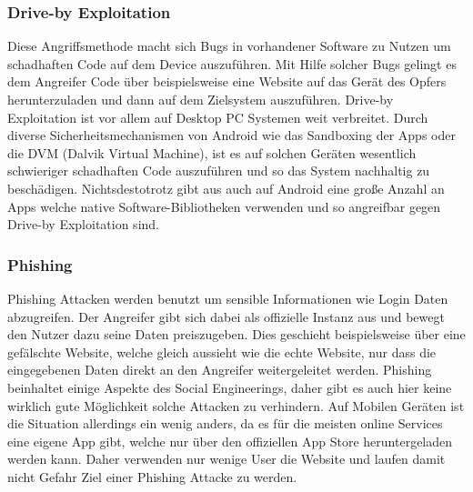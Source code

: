 \subsubsection{Drive-by Exploitation}
Diese Angriffsmethode macht sich Bugs in vorhandener Software zu Nutzen um schadhaften Code auf dem Device auszuführen. Mit Hilfe solcher Bugs gelingt es dem Angreifer Code über beispielsweise eine Website auf das Gerät des Opfers herunterzuladen und dann auf dem Zielsystem auszuführen. Drive-by Exploitation ist vor allem auf Desktop PC Systemen weit verbreitet. Durch diverse Sicherheitsmechanismen von Android wie das Sandboxing der Apps oder die DVM (Dalvik Virtual Machine), ist es auf solchen Geräten wesentlich schwieriger schadhaften Code auszuführen und so das System nachhaltig zu beschädigen. Nichtsdestotrotz gibt aus auch auf Android eine große Anzahl an Apps welche native Software-Bibliotheken verwenden und so angreifbar gegen Drive-by Exploitation sind.
\subsubsection{Phishing}
Phishing Attacken werden benutzt um sensible Informationen wie Login Daten abzugreifen. Der Angreifer gibt sich dabei als offizielle Instanz aus und bewegt den Nutzer dazu seine Daten preiszugeben. Dies geschieht beispielsweise über eine gefälschte Website, welche gleich aussieht wie die echte Website, nur dass die eingegebenen Daten direkt an den Angreifer weitergeleitet werden. Phishing beinhaltet einige Aspekte des Social Engineerings, daher gibt es auch hier keine wirklich gute Möglichkeit solche Attacken zu verhindern. Auf Mobilen Geräten ist die Situation allerdings ein wenig anders, da es für die meisten online Services eine eigene App gibt, welche nur über den offiziellen App Store heruntergeladen werden kann. Daher verwenden nur wenige User die Website und laufen damit nicht Gefahr Ziel einer Phishing Attacke zu werden.


